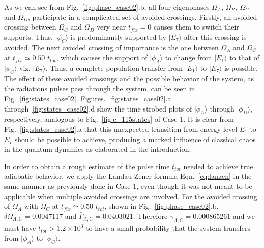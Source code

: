 As we can see from Fig.~\ref{fig:phase_case02}.b,  all four eigenphases $\Omega_A$, $\Omega_B$, $\Omega_C$ and $\Omega_D$, participate in a complicated set of avoided crossings. Firstly, an avoided crossing between $\Omega_C$ and $\Omega_D$ very near $t_{fix} = 0$ causes them to switch their supports. Thus, $\vert \phi_C \rangle$ is predominantly supported by $\vert E_7\rangle$ after this crossing is avoided. The next avoided crossing of importance is the one between $\Omega_A$ and $\Omega_C$ at $t_{fix}\simeq 0.50$ $t_{tot}$, which causes the support of $\vert \phi_A \rangle$ to change from $\vert E_1 \rangle$ to that of  $\vert \phi_C\rangle$ viz. $\vert E_7\rangle$. Thus, a complete population transfer from  $\vert E_1\rangle$ to  $\vert E_7\rangle$ is possible. The effect of these avoided crossings and the possible behavior of the  system, as the radiations pulses pass through the system, can be seen in Fig.~\ref{fig:states_case02}. Figures.~\ref{fig:states_case02}.a through~\ref{fig:states_case02}.d show the time strobed plots of $\vert \phi_A \rangle $ through $\vert \phi_D \rangle$, respectively, analogous to Fig.~\ref{fig:e_115states} of Case 1. It is clear from Fig.~\ref{fig:states_case02}.a that this unexpected transition from energy level $E_1$ to $E_7$ should be possible to achieve, producing a marked influence of classical chaos in the quantum dynamics as elaborated in the introduction.

In order to obtain a rough estimate of the pulse time $t_{tot}$ needed to achieve true adiabatic behavior,   we apply the Landau Zener formula  Eqn.~\eqref{eq:lanzen} in the same manner as previously done in Case 1, even though it was not meant to be applicable when multiple avoided crossings are involved. For the avoided crossing of $\Omega_A$ with  $\Omega_C$ at $t_{fix}\simeq 0.50$ $t_{tot}$, shown in Fig.~\ref{fig:phase_case02}.b, $\delta \Omega_{A,C} = 0.0047117$ and ${\bar \Gamma}_{A,C} = 0.0403021$. Therefore $\gamma_{A,C} = 0.000865261$ and we must have $t_{tot} > 1.2 {\times} 10^3$ to have a small probability that the system transfers from $\vert \phi_A\rangle$ to $\vert \phi_C \rangle$. 

